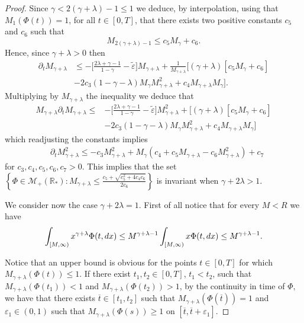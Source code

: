 \documentclass[11pt]{article}
\numberwithin{equation}{section}
\theoremstyle{plain}
\newcommand{\der}{\textup{d}}
\begin{document}
\begin{proof}
Since $\gamma < 2(\gamma +\lambda ) -1 \leq 1 $ we deduce, by interpolation, using that $M_{1}(\Phi(t))=1$, for all $t\in[0,T]$, that there exists two positive constants $c_5$ and $c_6$ such that 
\[
M_{ 2(\gamma +\lambda ) -1 } \leq c_5 M_\gamma  + c_6. 
\]
Hence, since $\gamma + \lambda >0$ then 
\begin{align*}
\partial_{t} M_{\gamma +\lambda}& \leq- \big[\frac{2\lambda + \gamma -1 }{1-\gamma}-\tilde{\varepsilon}\big] M_{\gamma+\lambda}
+ \frac{1}{M_{\gamma+\lambda}} [ (\gamma +\lambda) \left[ c_5 M_\gamma  + c_6 \right]\\
&- 2c_3 \left(1-\gamma-\lambda \right)
 M_{\gamma } M_{\gamma+ \lambda}^2 +c_{4}M_{\gamma+\lambda}M_{\gamma}].
\end{align*}
Multiplying by $M_{\gamma +\lambda}$ the inequality we deduce that 
\begin{align*}
  M_{\gamma +\lambda}  \partial_{t} M_{\gamma +\lambda} \leq&- \big[\frac{2\lambda + \gamma -1 }{1-\gamma}-\tilde{\varepsilon}\big] M_{\gamma+\lambda}^2
+  [ (\gamma +\lambda) \left[ c_5 M_\gamma  + c_6 \right]\\
&- 2c_3 \left(1-\gamma-\lambda \right)
 M_{\gamma } M_{\gamma+ \lambda}^2+c_{4}M_{\gamma+\lambda}M_{\gamma}]
\end{align*}
which readjusting the constants implies 
\begin{align}\label{constant gamma lambda larger one}
&  \partial_{t} M_{\gamma +\lambda}^2 \leq- c_3 M_{\gamma+\lambda}^2
+  M_\gamma \left( c_4 +c_{5}M_{\gamma+\lambda}  - c_6 M_{\gamma+ \lambda}^2 \right) + c_7
\end{align}
for $c_3, c_4, c_5, c_6,c_{7}>0.$
This implies that the set $\left\{ \Phi \in \mathcal M_{+}(\mathbb R_*) : M_{\gamma +\lambda } \leq  \frac{ c_5+\sqrt{c_5^{2}+4c_{4}c_{6}}}{2 c_{6} } \right\} $ is invariant when $\gamma + 2 \lambda >1.$

We consider now the case $\gamma + 2 \lambda =1.$ 
First of all notice that for every $M < R $ we have 
\[
\int_{[M, \infty ) } x^{\gamma + \lambda} \Phi(t, \der x) \leq M^{\gamma+\lambda -1 } \int_{[M , \infty )} x \Phi(t, \der x ) \leq M^{\gamma + \lambda -1}.
\] 

Notice that an upper bound is obvious for the points $t\in[0,T]$ for which $M_{\gamma+\lambda}(\Phi(t))\leq 1$. 
If there exist $t_{1},t_{2}\in[0,T]$, $t_{1}<t_{2}$, such that  $M_{\gamma+\lambda}(\Phi(t_{1}))<1$ and $M_{\gamma+\lambda}(\Phi(t_{2}))>1$, by the continuity in time of $\Phi,$ we have that there exists $\overline{t}\in[t_{1},t_{2}]$ such that $M_{\gamma+\lambda}(\Phi(\overline{t}))=1$ and $\varepsilon_{1}\in(0,1)$ such that $M_{\gamma+\lambda}(\Phi(s))\geq 1$ on $[\overline{t},\overline{t}+\varepsilon_{1}]$.


\end{proof}
\end{document}
